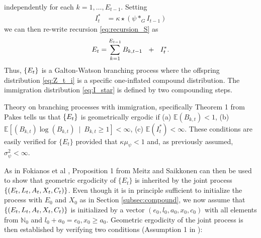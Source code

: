 \documentclass{article}
\begin{document}
independently for each $k = 1, \dots, E_{t - 1}$. Setting
\begin{align}
I^*_t & = \kappa\star (\psi *_G I_{t - 1}) \label{eq:I_star}
\end{align}
we can then re-write recursion \eqref{eq:recursion_S} as
$$
E_t = \sum_{k = 1}^{E_{t - 1}} B_{k, t - 1} \ \ + \ \ I^*_t.
$$
Thus, $\{E_t\}$ is a Galton-Watson branching process where the offspring distribution \eqref{eq:Z_t_i} is a specific one-inflated compound distribution. %
The immigration distribution \eqref{eq:I_star} is defined by two compounding steps. %

Theory on branching processes with immigration, specifically Theorem 1 from Pakes \cite{Pakes1971} tells us that $\{E_t\}$ is geometrically ergodic if (a) $\mathbb{E}(B_{k, t}) < 1$, (b) $\mathbb{E}[(B_{k, t})\log(B_{k, t}) \ \mid \ B_{k, t} \geq 1] < \infty$, (c) $\mathbb{E}(I^*_t) < \infty$. These conditions are easily verified for $\{E_t\}$ provided that $\kappa\mu_\psi < 1$ and, as previously assumed, $\sigma^2_\psi < \infty$.


As in Fokianos et al \cite{Fokianos2009}, Proposition 1 from Meitz and Saikkonen \cite{Meitz2008} can then be used to show that geometric ergodicity of $\{E_t\}$ is inherited by the joint process $\{(E_t, L_t, A_t, X_t, C_t)\}$. %
Even though it is in principle sufficient to initialize the process with $E_0$ and $X_0$ as in Section \ref{subsec:compound}, we now assume that $\{(E_t, L_t, A_t, X_t, C_t)\}$ is initialized by a vector $(e_0, l_0, a_0, x_0, c_0)$ with all elements from $\mathbb{N}_0$ and $l_0 + a_0 = e_0, x_0 \geq a_0$. Geometric ergodicity of the joint process is then established by verifying two conditions (Assumption 1 in \cite{Meitz2008}):
\end{document}
